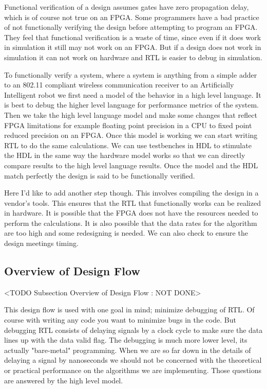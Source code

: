 Functional verification of a design assumes gates have zero propagation delay, which is of course not true on an FPGA. Some programmers have a bad practice of not functionally verifying the design before attempting to program an FPGA. They feel that functional verification is a waste of time, since even if it does work in simulation it still may not work on an FPGA. But if a design does not work in simulation it can not work on hardware and RTL is easier to debug in simulation.

To functionally verify a system, where a system is anything from a simple adder to an 802.11 compliant wireless communication receiver to an Artificially Intelligent robot we first need a model of the behavior in a high level language. It is best to debug the higher level language for performance metrics of the system. Then we take the high level language model and make some changes that reflect FPGA limitations for example floating point precision in a \ac{CPU} to fixed point reduced precision on an FPGA. Once this model is working we can start writing \ac{RTL} to do the same calculations. We can use testbenches in \ac{HDL} to stimulate the \ac{HDL} in the same way the hardware model works so that we can directly compare results to the high level language results. Once the model and the \ac{HDL} match perfectly the design is said to be functionally verified.

Here I'd like to add another step though. This involves compiling the design in a vendor's tools. This ensures that the \ac{RTL} that functionally works can be realized in hardware. It is possible that the FPGA does not have the resources needed to perform the calculations. It is also possible that the data rates for the algorithm are too high and some redesigning is needed. We can also check to ensure the design meetings timing.

		

\subsection{Overview of Design Flow}
	<TODO Subsection Overview of Design Flow : NOT DONE>

This design flow is used with one goal in mind; minimize debugging of \ac{RTL}. Of course with writing any code you want to minimize bugs in the code. But debugging \ac{RTL} consists of delaying signals by a clock cycle to make sure the data lines up with the data valid flag. The debugging is much more lower level, its actually "bare-metal" programming. When we are so far down in the details of delaying a signal by nanoseconds we should not be concerned with the theoretical or practical performance on the algorithms we are implementing. Those questions are answered by the high level model.  
	
